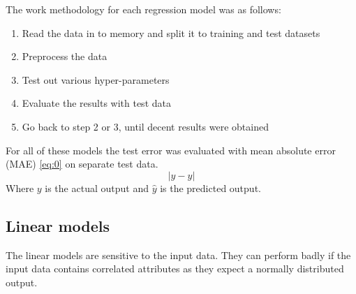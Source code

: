 \documentclass[a4paper]{article}
\begin{document}
The work methodology for each regression model was as follows:
\begin{enumerate}
  \item Read the data in to memory and split it to training and test datasets
  \item Preprocess the data
  \item Test out various hyper-parameters
  \item Evaluate the results with test data
  \item Go back to step 2 or 3, until decent results were obtained
\end{enumerate}
For all of these models the test error was evaluated with mean absolute error (MAE) \ref{eq:0} on separate test data.
\begin{equation} \label{eq:0}
|y - \hat{y}|
\end{equation}
Where $y$ is the actual output and $\hat{y}$ is the predicted output.

\subsection{Linear models}
The linear models are sensitive to the input data. They can perform badly if the input data contains correlated attributes as they expect a normally distributed output.
\end{document}
